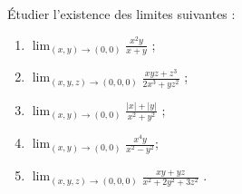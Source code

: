 \begin{exercice}[\minsyndical]\label{exoLimiteContinue0005}

Étudier l'existence des limites suivantes :
\begin{multicols}{2}
	\begin{enumerate}
		\item\label{ex_limcont_0005_uno}
			$\displaystyle \lim_{(x,y)\to (0,0)} \frac{x^2y}{x+y}$ ; 
		\item
			$\displaystyle \lim_{(x,y,z)\to (0,0,0)} \frac{xyz+z^3}{2x^3+yz^2}$ ; 
		\item
			$\displaystyle \lim_{(x,y)\to (0,0)} \frac{|x|+|y|}{x^2+y^2}$ ; 
		\item
			$\displaystyle\lim_{(x,y)\to (0,0)} \frac{x^4y}{x^2-y^2}$;
		\item
			$\displaystyle \lim_{(x,y,z)\to (0,0,0)} \frac{xy+yz}{x^2+2y^2+3z^2}$ . 
	\end{enumerate}
\end{multicols}

\end{exercice}
